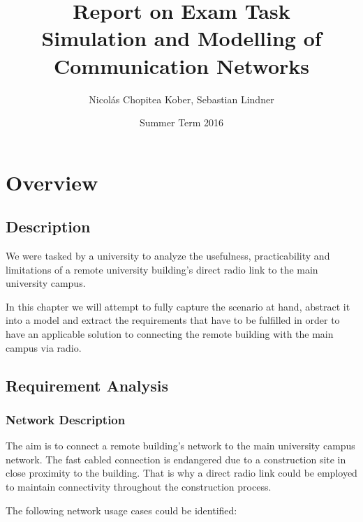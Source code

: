 \documentclass[a4paper]{scrreprt}
\makeatletter
\renewenvironment{titlepage}
    {%
      \if@twocolumn
        \@restonecoltrue\onecolumn
      \else
        \@restonecolfalse\newpage
      \fi
      \thispagestyle{plain}%
    }%
    {\if@restonecol\twocolumn \else \newpage \fi
    }
\makeatother
\begin{document}
\title{Report on Exam Task\\Simulation and Modelling of Communication Networks}
\author{Nicolás Chopitea Kober, Sebastian Lindner}
\date{Summer Term 2016}
\begin{titlepage}
\maketitle	
\end{titlepage}

\tableofcontents
\newpage

\chapter{Overview}
\section{Description}
	We were tasked by a university to analyze the usefulness, practicability and limitations of a remote university building's direct radio link to the main university campus. 
	
	In this chapter we will attempt to fully capture the scenario at hand, abstract it into a model and extract the requirements that have to be fulfilled in order to have an applicable solution to connecting the remote building with the main campus via radio.
\section{Requirement Analysis}
	\subsection{Network Description}
		The aim is to connect a remote building's network to the main university campus network. The fast cabled connection is endangered due to a construction site in close proximity to the building. That is why a direct radio link could be employed to maintain connectivity throughout the construction process.
		
		The following network usage cases could be identified:
		
\end{document}
